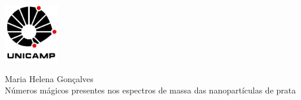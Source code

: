 \pagestyle{plain}
\thispagestyle{empty}
\vspace{-5cm}
\includegraphics[width=.94\textwidth, height=1in,
keepaspectratio=true]{logos/logo_Unicamp}

\begin{center}
{\large Maria Helena Gonçalves}\\ 
\vspace{7.5cm}
{\huge Números mágicos presentes
\vspace{0.4cm}
nos espectros de massa das nanopartículas de prata}

\vspace{3.5cm}

\end{center}

\begin{center}



\vspace{2cm}







\end{center}

\vspace{2cm}

\begin{center}

 \\
 \\

\end{center}

\newpage

$ $

\newpage
